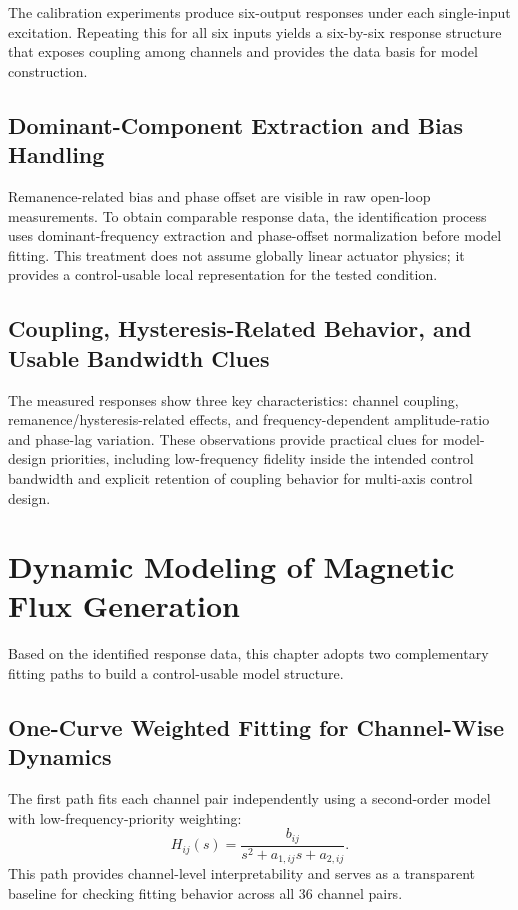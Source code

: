 The calibration experiments produce six-output responses under each single-input excitation. Repeating this for all six inputs yields a six-by-six response structure that exposes coupling among channels and provides the data basis for model construction.

\subsection{Dominant-Component Extraction and Bias Handling}

Remanence-related bias and phase offset are visible in raw open-loop measurements. To obtain comparable response data, the identification process uses dominant-frequency extraction and phase-offset normalization before model fitting. This treatment does not assume globally linear actuator physics; it provides a control-usable local representation for the tested condition.

\subsection{Coupling, Hysteresis-Related Behavior, and Usable Bandwidth Clues}

The measured responses show three key characteristics: channel coupling, remanence/hysteresis-related effects, and frequency-dependent amplitude-ratio and phase-lag variation. These observations provide practical clues for model-design priorities, including low-frequency fidelity inside the intended control bandwidth and explicit retention of coupling behavior for multi-axis control design.

\section{Dynamic Modeling of Magnetic Flux Generation}

Based on the identified response data, this chapter adopts two complementary fitting paths to build a control-usable model structure.

\subsection{One-Curve Weighted Fitting for Channel-Wise Dynamics}

The first path fits each channel pair independently using a second-order model with low-frequency-priority weighting:
\begin{equation}
H_{ij}(s) = \frac{b_{ij}}{s^{2} + a_{1,ij}s + a_{2,ij}} .
\end{equation}
This path provides channel-level interpretability and serves as a transparent baseline for checking fitting behavior across all 36 channel pairs.

